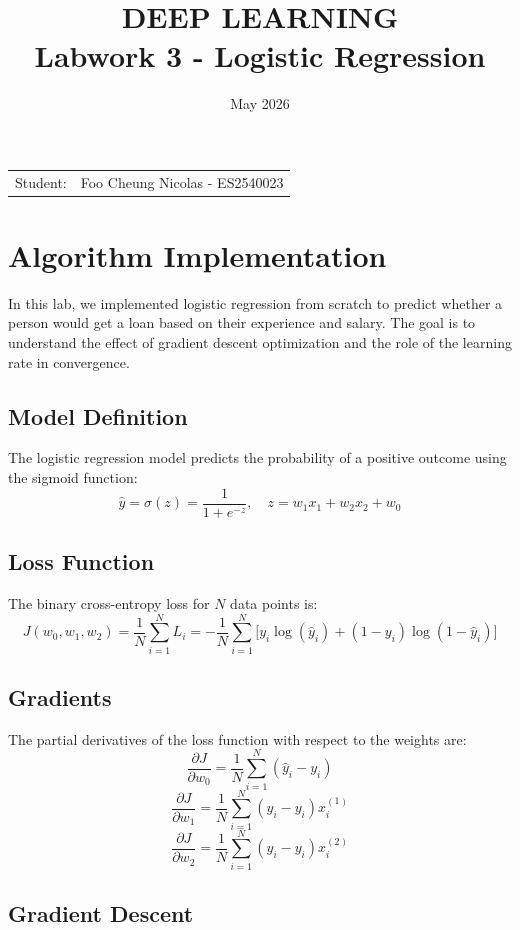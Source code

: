 \documentclass{article}
\title{\textbf{DEEP LEARNING} \\ 
{\Large \textbf{Labwork 3 - Logistic Regression}}}
\date{May 2026}
\begin{document}
\pagestyle{plain}
\maketitle

\noindent\begin{tabular}{@{}ll}
    Student: & Foo Cheung Nicolas - ES2540023 \\
\end{tabular}

\section{Algorithm Implementation}

In this lab, we implemented logistic regression from scratch to predict whether a person would get a loan based on their experience and salary. The goal is to understand the effect of gradient descent optimization and the role of the learning rate in convergence.



\subsection{Model Definition}

The logistic regression model predicts the probability of a positive outcome using the sigmoid function:
\[
\hat{y} = \sigma(z) = \frac{1}{1 + e^{-z}}, \quad z = w_1 x_1 + w_2 x_2 + w_0
\]
\subsection{Loss Function}

The binary cross-entropy loss for $N$ data points is:
\[
J(w_0, w_1, w_2) = \frac{1}{N} \sum_{i=1}^N L_i = -\frac{1}{N} \sum_{i=1}^N \Big[ y_i \log(\hat{y}_i) + (1-y_i) \log(1-\hat{y}_i) \Big]
\]

\subsection{Gradients}
The partial derivatives of the loss function with respect to the weights are:
\[
\frac{\partial J}{\partial w_0} = \frac{1}{N} \sum_{i=1}^N (\hat{y}_i - y_i)
\]
\[
\frac{\partial J}{\partial w_1} = \frac{1}{N} \sum_{i=1}^N (\hat{y}_i - y_i) x_i^{(1)}
\]
\[
\frac{\partial J}{\partial w_2} = \frac{1}{N} \sum_{i=1}^N (\hat{y}_i - y_i) x_i^{(2)}
\]

\subsection{Gradient Descent}
\end{document}
